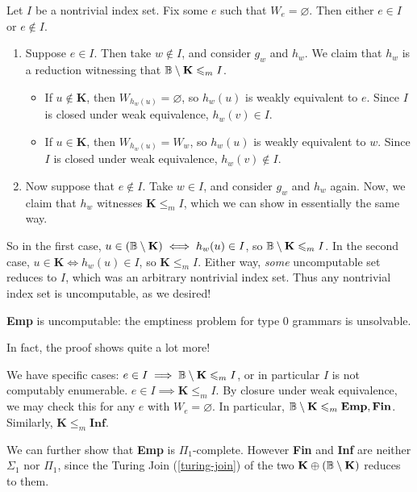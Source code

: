 \documentclass{article}
\begin{document}
\begin{prf}
	Let $I$ be a nontrivial index set. Fix some $e$ such that $W_e = \varnothing$. Then either $e \in I$ or $e \notin I$.
	\begin{enumerate}
		\item Suppose $e \in I$. Then take $w \notin I$, and consider $g_w$ and $h_w$. We claim that $h_w$ is a reduction witnessing that $\mathbb{B} \setminus \mathbf{K} \leqslant_m I$.
		      \begin{itemize}
		      	\item If $u \notin \mathbf{K}$, then $W_{h_w(u)} = \varnothing$, so $h_w(u)$ is weakly equivalent to $e$. Since $I$ is closed under weak equivalence, $h_w(v) \in I$.
		      	\item If $u \in \mathbf{K}$, then $W_{h_w(u)} = W_w$, so $h_w(u)$ is weakly equivalent to $w$. Since $I$ is closed under weak equivalence, $h_w(v) \notin I$.
		      \end{itemize}
		\item Now suppose that $e \notin I$. Take $w \in I$, and consider $g_w$ and $h_w$ again. Now, we claim that $h_w$ witnesses $\mathbf{K} \leq_m I$, which we can show in essentially the same way.
	\end{enumerate}
	So in the first case, $u \in (\mathbb{B} \setminus \mathbf{K}) \iff h_w(u) \in I$, so $\mathbb{B} \setminus \mathbf{K} \leqslant_m I$. In the second case, $u \in \mathbf{K} \iff h_w(u) \in I$, so $\mathbf{K} \leq_m I$. Either way, \textit{some} uncomputable set reduces to $I$, which was an arbitrary nontrivial index set. Thus any nontrivial index set is uncomputable, as we desired!
\end{prf}

\begin{corollary}
	\textbf{Emp} is uncomputable: the emptiness problem for type 0 grammars is unsolvable.
\end{corollary}

In fact, the proof shows quite a lot more!

We have specific cases: $e \in I \implies \mathbb{B} \setminus \mathbf{K} \leqslant_m I$, or in particular $I$ is not computably enumerable. $e \in I \implies \mathbf{K} \leq_m I$. By closure under weak equivalence, we may check this for any $e$ with $W_e = \varnothing$. In particular, $\mathbb{B} \setminus \mathbf{K} \leqslant_m \textbf{Emp}, \textbf{Fin}$. Similarly, $\mathbf{K} \leq_m \textbf{Inf}$.

We can further show that \textbf{Emp} is $\Pi_1$-complete. However \textbf{Fin} and \textbf{Inf} are neither $\Sigma_1$ nor $\Pi_1$, since the Turing Join (\ref{turing-join}) of the two $\mathbf{K} \oplus (\mathbb{B} \setminus \mathbf{K})$ reduces to them.
\end{document}
